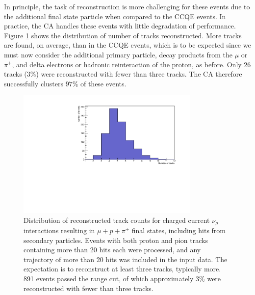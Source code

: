 In principle, the task of reconstruction is more challenging for these events due to the additional final state particle when compared to the CCQE events. In practice, the \ac{CA} handles these events with little degradation of performance. Figure \ref{fig:ca-ccpi-trackcounts} shows the distribution of number of tracks reconstructed. More tracks are found, on average, than in the CCQE events, which is to be expected since we must now consider the additional primary particle, decay products from the $\mu$ or $\pi^+$, and delta electrons or hadronic reinteraction of the proton, as before. Only 26 tracks ($3\%$) were reconstructed with fewer than three tracks. The \ac{CA} therefore successfully clusters $97\%$ of these events.

\begin{figure}
    \centering
    \includegraphics[angle=-90,width=0.8\textwidth]{chapters/cellularautomaton_images/ccpi-trackcounts}
    \caption[Number of reconstructed tracks in CC$\pi$ events]{\label{fig:ca-ccpi-trackcounts}Distribution of reconstructed track counts for charged current $\nu_\mu$ interactions resulting in $\mu + p + \pi^+$ final states, including hits from secondary particles. Events with both proton and pion tracks containing more than 20 hits each were processed, and any trajectory of more than 20 hits was included in the input data. The expectation is to reconstruct at least three tracks, typically more. 891 events passed the range cut, of which approximately $3\%$ were reconstructed with fewer than three tracks.}
\end{figure}


